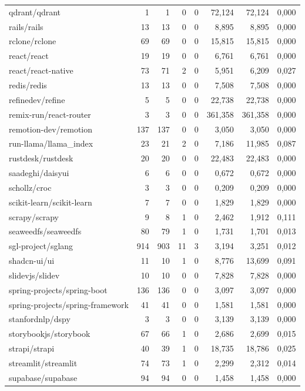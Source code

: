 \begin{tabular}{lrrrrrrr}
qdrant/qdrant & 1 & 1 & 0 & 0 & 72,124 & 72,124 & 0,000 \\
rails/rails & 13 & 13 & 0 & 0 & 8,895 & 8,895 & 0,000 \\
rclone/rclone & 69 & 69 & 0 & 0 & 15,815 & 15,815 & 0,000 \\
react/react & 19 & 19 & 0 & 0 & 6,761 & 6,761 & 0,000 \\
react/react-native & 73 & 71 & 2 & 0 & 5,951 & 6,209 & 0,027 \\
redis/redis & 13 & 13 & 0 & 0 & 7,508 & 7,508 & 0,000 \\
refinedev/refine & 5 & 5 & 0 & 0 & 22,738 & 22,738 & 0,000 \\
remix-run/react-router & 3 & 3 & 0 & 0 & 361,358 & 361,358 & 0,000 \\
remotion-dev/remotion & 137 & 137 & 0 & 0 & 3,050 & 3,050 & 0,000 \\
run-llama/llama\_index & 23 & 21 & 2 & 0 & 7,186 & 11,985 & 0,087 \\
rustdesk/rustdesk & 20 & 20 & 0 & 0 & 22,483 & 22,483 & 0,000 \\
saadeghi/daisyui & 6 & 6 & 0 & 0 & 0,672 & 0,672 & 0,000 \\
schollz/croc & 3 & 3 & 0 & 0 & 0,209 & 0,209 & 0,000 \\
scikit-learn/scikit-learn & 7 & 7 & 0 & 0 & 1,829 & 1,829 & 0,000 \\
scrapy/scrapy & 9 & 8 & 1 & 0 & 2,462 & 1,912 & 0,111 \\
seaweedfs/seaweedfs & 80 & 79 & 1 & 0 & 1,731 & 1,701 & 0,013 \\
sgl-project/sglang & 914 & 903 & 11 & 3 & 3,194 & 3,251 & 0,012 \\
shadcn-ui/ui & 11 & 10 & 1 & 0 & 8,776 & 13,699 & 0,091 \\
slidevjs/slidev & 10 & 10 & 0 & 0 & 7,828 & 7,828 & 0,000 \\
spring-projects/spring-boot & 136 & 136 & 0 & 0 & 3,097 & 3,097 & 0,000 \\
spring-projects/spring-framework & 41 & 41 & 0 & 0 & 1,581 & 1,581 & 0,000 \\
stanfordnlp/dspy & 3 & 3 & 0 & 0 & 3,139 & 3,139 & 0,000 \\
storybookjs/storybook & 67 & 66 & 1 & 0 & 2,686 & 2,699 & 0,015 \\
strapi/strapi & 40 & 39 & 1 & 0 & 18,735 & 18,786 & 0,025 \\
streamlit/streamlit & 74 & 73 & 1 & 0 & 2,299 & 2,312 & 0,014 \\
supabase/supabase & 94 & 94 & 0 & 0 & 1,458 & 1,458 & 0,000 \\

\end{tabular}
